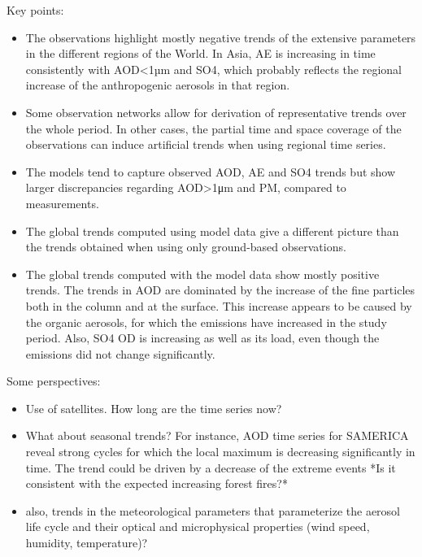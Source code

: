 \documentclass[journal abbreviation, manuscript]{copernicus}
\begin{document}
Key points:
\begin{itemize}
 \item The observations highlight mostly negative trends of the extensive parameters in the different regions of the World. In Asia, AE is increasing in time consistently with AOD<1µm and SO4, which probably reflects the regional increase of the anthropogenic aerosols in that region.
 \item Some observation networks allow for derivation of representative trends over the whole period. In other cases, the partial time and space coverage of the observations can induce artificial trends when using regional time series.
 \item The models tend to capture observed AOD, AE and SO4 trends but show larger discrepancies regarding AOD>1μm and PM, compared to measurements.
 \item The global trends computed using model data give a different picture than the trends obtained when using only ground-based observations.
 \item The global trends computed with the model data show mostly positive trends. The trends in AOD are dominated by the increase of the fine particles both in the column and at the surface. This increase appears to be caused by the organic aerosols, for which the emissions have increased in the study period. Also, SO4 OD is increasing as well as its load, even though the emissions did not change significantly.
\end{itemize}

Some perspectives:
\begin{itemize}
 \item  Use of satellites. How long are the time series now?
 \item What about seasonal trends? For instance, AOD time series for SAMERICA reveal strong cycles for which the local maximum is decreasing significantly in time. The trend could be driven by a decrease of the extreme events *Is it consistent with the expected increasing forest fires?*
 \item also, trends in the meteorological parameters that parameterize the aerosol life cycle and their optical and microphysical properties (wind speed, humidity, temperature)?
\end{itemize}


\end{document}
